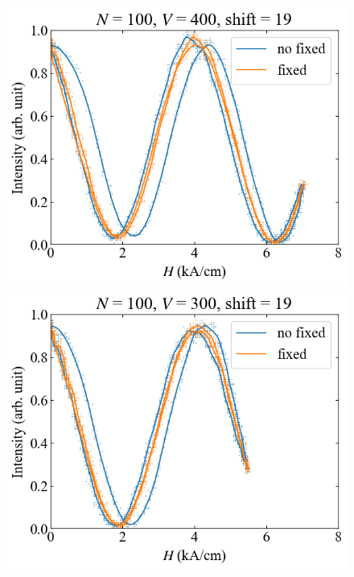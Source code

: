 \documentclass[9pt,dvipdfmx,a4paper]{jsarticle}
\begin{document}
\begin{figure}[H]
    \centering
    \begin{minipage}[t]{0.24\columnwidth}
        \centering
        \includegraphics[width = \columnwidth]{xy/05.png}
    \end{minipage}
    \hfill
    \begin{minipage}[t]{0.24\columnwidth}
        \centering
        \includegraphics[width = \columnwidth]{xy/06.png}
    \end{minipage}
    \hfill
    \begin{minipage}[t]{0.24\columnwidth}

\end{minipage}
\end{figure}
\end{document}
